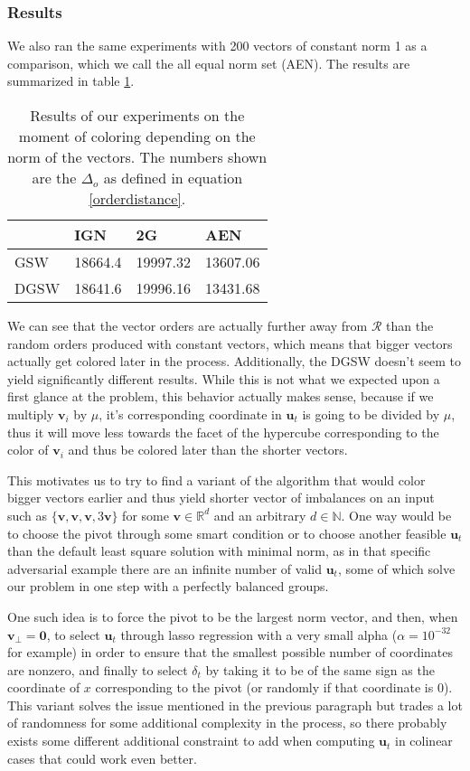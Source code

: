 \documentclass[12pt]{article}
\begin{document}
\subsubsection{Results}\label{results_norm_affect_when}
We also ran the same experiments with 200 vectors of constant norm 1 as a comparison, which we call the all equal norm set (AEN). The results are summarized in table \ref{norm_when_colored}.
\begin{table}[h!]
\centering
\caption{Results of our experiments on the moment of coloring depending on the norm of the vectors. The numbers shown are the $\Delta_o$ as defined in equation \ref{orderdistance}.}
\begin{tabular}{l|lll}
& IGN & 2G & AEN  \\
\hline
GSW & 18664.4 & 19997.32 & 13607.06 \\
DGSW & 18641.6 & 19996.16 & 13431.68
\end{tabular}
\label{norm_when_colored}
\end{table}

We can see that the vector orders are actually further away from $\mathcal{R}$ than the random orders produced with constant vectors, which means that bigger vectors actually get colored later in the process. Additionally, the DGSW doesn't seem to yield significantly different results. While this is not what we expected upon a first glance at the problem, this behavior actually makes sense, because if we multiply $\textbf{v}_i$ by $\mu%
$, it's corresponding coordinate in $\textbf{u}_t$ is going to be divided by $\mu$, thus it will move less towards the facet of the hypercube corresponding to the color of $\textbf{v}_i$ and thus be colored later than the shorter vectors.

This motivates us to try to find a variant of the algorithm that would color bigger vectors earlier and thus yield shorter vector of imbalances on an input such as $\{\textbf{v},\textbf{v},\textbf{v},3\textbf{v}\}$ for some $\textbf{v}\in\mathbb{R}^d$ and an arbitrary $d\in\mathbb{N}$. One way would be to choose the pivot through some smart condition or to choose another feasible $\textbf{u}_t$ than the default least square solution with minimal norm, as in that specific adversarial example there are an infinite number of valid $\textbf{u}_t$, some of which solve our problem in one step with a perfectly balanced groups.

One such idea is to force the pivot to be the largest norm vector, and then, when $\textbf{v}_\perp=\textbf{0}$, to select $\textbf{u}_t$ through lasso regression with a very small alpha ($\alpha=10^{-32}$ for example) in order to ensure that the smallest possible number of coordinates are nonzero, and finally to select $\delta_t$ by taking it to be of the same sign as the coordinate of $x$ corresponding to the pivot (or randomly if that coordinate is 0). This variant solves the issue mentioned in the previous paragraph but trades a lot of randomness for some additional complexity in the process, so there probably exists some different additional constraint to add when computing $\textbf{u}_t$ in colinear cases that could work even better.
\end{document}
